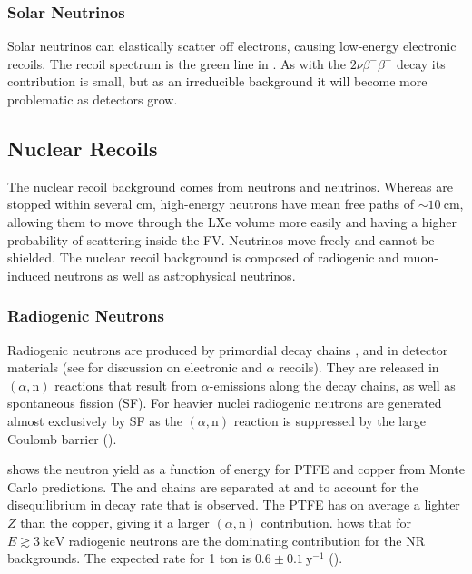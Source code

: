\subsubsection{Solar Neutrinos}
\label{subsubsec:backgrounds_electronic_solar_neutrinos}
Solar neutrinos can elastically scatter off electrons, causing low-energy electronic recoils.  The recoil spectrum is the green line in
.  As with the  $2 \nu \beta^- \beta^-$
decay its contribution is small, but as an irreducible background it will become more problematic as detectors grow.



\subsection{Nuclear Recoils}
\label{subsec:backgrounds_nuclear}
The nuclear recoil background comes from neutrons and neutrinos.  Whereas \gammarays are stopped within several cm, high-energy neutrons
have mean free paths of ${\sim}10\ \mathrm{cm}$, allowing them to move through the LXe volume more easily and having a higher probability
of scattering inside the FV.  Neutrinos move freely and cannot be shielded.  The nuclear recoil background is composed of
radiogenic and muon-induced neutrons as well as astrophysical neutrinos.



\subsubsection{Radiogenic Neutrons}
\label{subsubsec:backgrounds_nuclear_radiogenic}
Radiogenic neutrons are produced by primordial decay chains ,  and  in detector materials
(see  for discussion on electronic and $\alpha$ recoils).  They are released in
$(\alpha, \mathrm{n})$ reactions that result from $\alpha$-emissions along the decay chains, as well as spontaneous fission (SF).  For
heavier nuclei radiogenic neutrons are generated almost exclusively by SF as the $(\alpha, \mathrm{n})$ reaction is suppressed by the
large Coulomb barrier ().

 shows the neutron yield as a function of energy for PTFE and copper from Monte Carlo
predictions.  The  and  chains are
separated at  and  to account for the disequilibrium in decay rate
that is observed.  The PTFE has on average a lighter $Z$ than the copper, giving it a larger $(\alpha, \mathrm{n})$
contribution.   hows that for $E \gtrsim 3\ \mathrm{keV}$
radiogenic neutrons are the dominating contribution for the NR backgrounds.  The expected rate for 1 ton is
$0.6 \pm 0.1\ \mathrm{y^{-1}}$ ().

